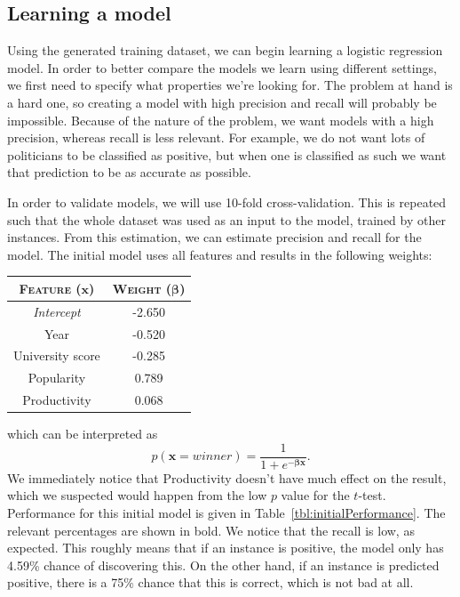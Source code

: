 \subsection{Learning a model}
Using the generated training dataset, we can begin learning a logistic regression model. In order to better compare the models we learn using different settings, we first need to specify what properties we're looking for. The problem at hand is a hard one, so creating a model with high precision and recall will probably be impossible. Because of the nature of the problem, we want models with a high precision, whereas recall is less relevant. For example, we do not want lots of politicians to be classified as positive, but when one is classified as such we want that prediction to be as accurate as possible.

In order to validate models, we will use 10-fold cross-validation. This is repeated such that the whole dataset was used as an input to the model, trained by other instances. From this estimation, we can estimate precision and recall for the model. The initial model uses all features and results in the following weights:
\begin{table}[H]
\centering
\begin{tabular}{c|c}
\textsc{\textbf{Feature}} ($\mathbf{x}$) & \textsc{\textbf{Weight}} ($\boldsymbol{\beta}$)\\ \hline
\rule{0pt}{4mm}\emph{Intercept}&-2.650\\
Year&-0.520\\
University score&-0.285\\
Popularity&0.789\\
Productivity&0.068\\
\end{tabular}
\end{table}
\noindent which can be interpreted as 
\begin{equation*}
	p(\mathbf{x} = winner) = \frac{1}{1 + e^{-\boldsymbol{\beta}\mathbf{x}}}.
\end{equation*}
We immediately notice that Productivity doesn't have much effect on the result, which we suspected would happen from the low $p$ value for the $t$-test. Performance for this initial model is given in Table~\ref{tbl:initialPerformance}. The relevant percentages are shown in bold. We notice that the recall is low, as expected. This roughly means that if an instance is positive, the model only has 4.59\% chance of discovering this. On the other hand, if an instance is predicted positive, there is a 75\% chance that this is correct, which is not bad at all. 

